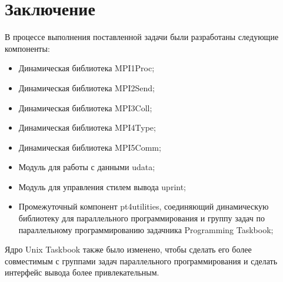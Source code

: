 \section{Заключение}

В процессе выполнения поставленной задачи были разработаны следующие компоненты:
\begin{itemize}
    \item Динамическая библиотека MPI1Proc;
    \item Динамическая библиотека MPI2Send;
    \item Динамическая библиотека MPI3Coll;
    \item Динамическая библиотека MPI4Type;
    \item Динамическая библиотека MPI5Comm;
    \item Модуль для работы с данными udata;
    \item Модуль для управления стилем вывода uprint;
    \item Промежуточный компонент pt4utilities, соединяющий динамическую библиотеку для параллельного программирования и группу задач по параллельному программированию задачника Programming Taskbook;
\end{itemize}

Ядро Unix Taskbook также было изменено, чтобы сделать его более совместимым с группами задач параллельного программирования и сделать интерфейс вывода более привлекательным.